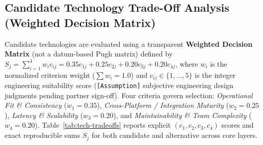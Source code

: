 \subsection{Candidate Technology Trade-Off Analysis (Weighted Decision Matrix)}
\label{sec:arch-tradeoffs}

Candidate technologies are evaluated using a transparent \textbf{Weighted Decision Matrix} (not a datum-based Pugh matrix) defined by $S_j = \sum_{i=1}^{4} w_i c_{ij} = 0.35 c_{1j} + 0.25 c_{2j} + 0.20 c_{3j} + 0.20 c_{4j}$, where $w_i$ is the normalized criterion weight ($\sum w_i = 1.0$) and $c_{ij} \in \{1,\dots,5\}$ is the integer engineering suitability score (\texttt{[Assumption]} subjective engineering design judgments pending partner sign-off). Four criteria govern selection: \emph{Operational Fit \& Consistency} ($w_1 = 0.35$), \emph{Cross-Platform / Integration Maturity} ($w_2 = 0.25$), \emph{Latency \& Scalability} ($w_3 = 0.20$), and \emph{Maintainability \& Team Complexity} ($w_4 = 0.20$). Table~\ref{tab:tech-tradeoffs} reports explicit $(c_1, c_2, c_3, c_4)$ scores and exact reproducible sums $S_j$ for both candidate and alternative across core layers.

